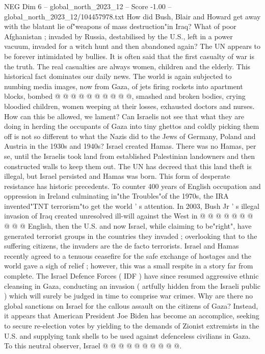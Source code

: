 \begin{textsample}{NEG Dim 6 – global\_north\_2023\_12 – Score -1.00 – global\_north\_2023\_12/104457978.txt}
How did Bush, Blair and Howard get away with the blatant lie of"weapons of mass destruction"in Iraq?
What of poor Afghanistan ; invaded by Russia, destabilised by the U.S., left in a power vacuum, invaded for a witch hunt and then abandoned again?
The UN appears to be forever intimidated by bullies.
It is often said that the first casualty of war is the truth.
The real casualties are always women, children and the elderly.
This historical fact dominates our daily news.
The world is again subjected to numbing media images, now from Gaza, of jets firing rockets into apartment blocks, bombed @ @ @ @ @ @ @ @ @ @, smashed and broken bodies, crying bloodied children, women weeping at their losses, exhausted doctors and nurses.
How can this be allowed, we lament?
Can Israelis not see that what they are doing in herding the occupants of Gaza into tiny ghettos and coldly picking them off is not so different to what the Nazis did to the Jews of Germany, Poland and Austria in the 1930s and 1940s?
Israel created Hamas.
There was no Hamas, per se, until the Israelis took land from established Palestinian landowners and then constructed walls to keep them out.
The UN has decreed that this land theft is illegal, but Israel persisted and Hamas was born.
This form of desperate resistance has historic precedents.
To counter 400 years of English occupation and oppression in Ireland culminating in"the Troubles"of the 1970s, the IRA invented"TNT terrorism"to get the world ' s attention.
In 2003, Bush Jr ' s illegal invasion of Iraq created unresolved ill-will against the West in @ @ @ @ @ @ @ @ @ @ English, then the U.S. and now Israel, while claiming to be"right", have generated terrorist groups in the countries they invaded ; overlooking that to the suffering citizens, the invaders are the de facto terrorists.
Israel and Hamas recently agreed to a tenuous ceasefire for the safe exchange of hostages and the world gave a sigh of relief ; however, this was a small respite in a story far from complete.
The Israel Defence Forces ( IDF ) have since resumed aggressive ethnic cleansing in Gaza, conducting an invasion ( artfully hidden from the Israeli public ) which will surely be judged in time to comprise war crimes.
Why are there no global sanctions on Israel for the callous assault on the citizens of Gaza?
Instead, it appears that American President Joe Biden has become an accomplice, seeking to secure re-election votes by yielding to the demands of Zionist extremists in the U.S. and supplying tank shells to be used against defenceless civilians in Gaza.
To this neutral observer, Israel @ @ @ @ @ @ @ @ @ @.

\end{textsample}
